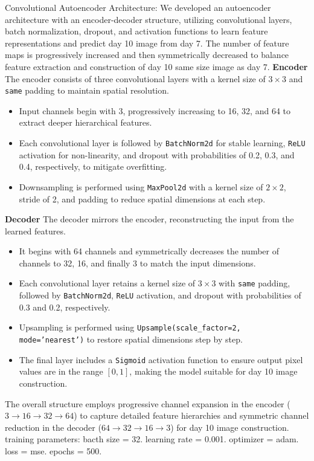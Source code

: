 Convolutional Autoencoder Architecture:
We developed an autoencoder architecture with an encoder-decoder structure, utilizing convolutional layers, batch normalization, dropout, and activation functions
 to learn feature representations and predict day 10 image from day 7. The number of feature maps is progressively increased and then symmetrically decreased to balance
  feature extraction and construction of day 10 same size image as day 7.   
  \textbf{Encoder}
  The encoder consists of three convolutional layers with a kernel size of $3 \times 3$ and \texttt{same} padding to maintain spatial resolution.  
  \begin{itemize}
      \item Input channels begin with 3, progressively increasing to 16, 32, and 64 to extract deeper hierarchical features.  
      \item Each convolutional layer is followed by \texttt{BatchNorm2d} for stable learning, \texttt{ReLU} activation for non-linearity, and dropout with probabilities of 0.2, 0.3, and 0.4, respectively, to mitigate overfitting.  
      \item Downsampling is performed using \texttt{MaxPool2d} with a kernel size of $2 \times 2$, stride of 2, and padding to reduce spatial dimensions at each step.  
  \end{itemize}
  
  \textbf{Decoder}
  The decoder mirrors the encoder, reconstructing the input from the learned features.  
  \begin{itemize}
      \item It begins with 64 channels and symmetrically decreases the number of channels to 32, 16, and finally 3 to match the input dimensions.  
      \item Each convolutional layer retains a kernel size of $3 \times 3$ with \texttt{same} padding, followed by \texttt{BatchNorm2d}, \texttt{ReLU} activation, and dropout with probabilities of 0.3 and 0.2, respectively.  
      \item Upsampling is performed using \texttt{Upsample(scale\_factor=2, mode='nearest')} to restore spatial dimensions step by step.  
      \item The final layer includes a \texttt{Sigmoid} activation function to ensure output pixel values are in the range $[0, 1]$, making the model suitable for 
      day 10 image construction.  
  \end{itemize}
  

The overall structure employs progressive channel expansion in the encoder (\(3 \to 16 \to 32 \to 64\)) to capture detailed feature hierarchies and symmetric 
channel reduction in the decoder (\(64 \to 32 \to 16 \to 3\)) for day 10 image construction. 
training parameters: bacth size = 32. learning rate = 0.001. optimizer = adam. loss = mse. epochs = 500. 


